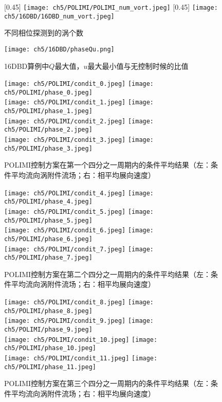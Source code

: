 \begin{figure}[htb]
  \centering
  [0.45\textwidth]
    {\texttt{[image: ch5/POLIMI/POLIMI\_num\_vort.jpeg]}}
  [0.45\textwidth]
    {\texttt{[image: ch5/16DBD/16DBD\_num\_vort.jpeg]}}
  \caption{不同相位探测到的涡个数}\label{f:vortex_num}
\end{figure}
\begin{figure}[htb]
  \centering
  \texttt{[image: ch5/16DBD/phaseQu.png]}
  \caption{16DBD算例中$Q$最大值，$u$最大最小值与无控制时候的比值}\label{f:Qu}
\end{figure}
\begin{figure}[htb]
  \centering
  \texttt{[image: ch5/POLIMI/condit\_0.jpeg]}
  \texttt{[image: ch5/POLIMI/phase\_0.jpeg]}\\
  \texttt{[image: ch5/POLIMI/condit\_1.jpeg]}
  \texttt{[image: ch5/POLIMI/phase\_1.jpeg]}\\
  \texttt{[image: ch5/POLIMI/condit\_2.jpeg]}
  \texttt{[image: ch5/POLIMI/phase\_2.jpeg]}\\
  \texttt{[image: ch5/POLIMI/condit\_3.jpeg]}
  \texttt{[image: ch5/POLIMI/phase\_3.jpeg]}
  \caption{POLIMI控制方案在第一个四分之一周期内的条件平均结果（左：条件平均流向涡附件流场；右：相平均展向速度）}\label{f:polimi_conditionally1}
\end{figure}
\begin{figure}[htb]
  \centering
  \texttt{[image: ch5/POLIMI/condit\_4.jpeg]}
  \texttt{[image: ch5/POLIMI/phase\_4.jpeg]}\\
  \texttt{[image: ch5/POLIMI/condit\_5.jpeg]}
  \texttt{[image: ch5/POLIMI/phase\_5.jpeg]}\\
  \texttt{[image: ch5/POLIMI/condit\_6.jpeg]}
  \texttt{[image: ch5/POLIMI/phase\_6.jpeg]}\\
  \texttt{[image: ch5/POLIMI/condit\_7.jpeg]}
  \texttt{[image: ch5/POLIMI/phase\_7.jpeg]}
  \caption{POLIMI控制方案在第二个四分之一周期内的条件平均结果（左：条件平均流向涡附件流场；右：相平均展向速度）}\label{f:polimi_conditionally2}
\end{figure}
\begin{figure}[htb]
  \centering
  \texttt{[image: ch5/POLIMI/condit\_8.jpeg]}
  \texttt{[image: ch5/POLIMI/phase\_8.jpeg]}\\
  \texttt{[image: ch5/POLIMI/condit\_9.jpeg]}
  \texttt{[image: ch5/POLIMI/phase\_9.jpeg]}\\
  \texttt{[image: ch5/POLIMI/condit\_10.jpeg]}
  \texttt{[image: ch5/POLIMI/phase\_10.jpeg]}\\
  \texttt{[image: ch5/POLIMI/condit\_11.jpeg]}
  \texttt{[image: ch5/POLIMI/phase\_11.jpeg]}
  \caption{POLIMI控制方案在第三个四分之一周期内的条件平均结果（左：条件平均流向涡附件流场；右：相平均展向速度）}\label{f:polimi_conditionally3}
\end{figure}

